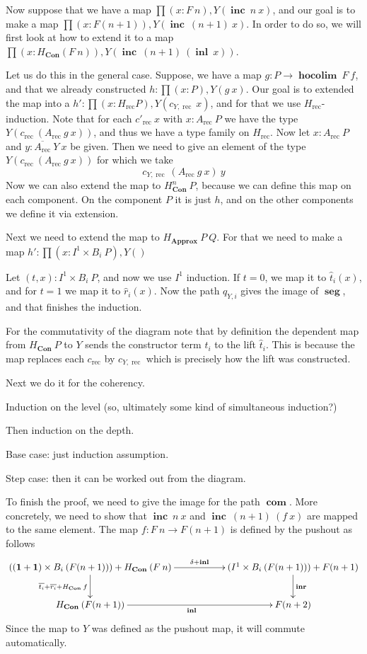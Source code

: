 \documentclass[a4paper,UKenglish]{lipics-v2016}
\newcommand{\one}[0]{\textbf{1}}
\newcommand{\rec}[0]{\operatorname{rec}}
\newcommand{\Con}[0]{\textbf{Con}}
\newcommand{\Approx}[0]{\textbf{Approx}}
\newcommand{\hocolim}[0]{\operatorname{\textbf{hocolim}}}
\newcommand{\seg}[0]{\operatorname{\textbf{seg}}}
\newcommand{\inl}[0]{\operatorname{\textbf{inl}}}
\newcommand{\inr}[0]{\operatorname{\textbf{inr}}}
\newcommand{\inc}[0]{\operatorname{\textbf{inc}}}
\newcommand{\com}[0]{\operatorname{\textbf{com}}}
\newcommand{\dak}[1]{\widehat{#1}}
\newcommand{\hatt}{\dak{t}}
\newcommand{\hatr}{\dak{r}}
\begin{document}
Now suppose that we have a map $\prod (x : F \> n), Y(\inc \> n \> x)$, and our goal is to make a map $\prod  (x : F(n+1)), Y(\inc \> (n+1) \> x)$.
In order to do so, we will first look at how to extend it to a map $\prod (x : H_{\Con} (F \> n)), Y(\inc \> (n+1) \> (\inl \> x))$.

Let us do this in the general case.
Suppose, we have a map $g : P \rightarrow \hocolim \> F \> f$, and that we already constructed $h : \prod (x : P), Y(g \> x)$.
Our goal is to extended the map into a $h' : \prod (x : H_{\rec} P), Y(c_{Y, \rec} \> x)$, and for that we use $H_{\rec}$-induction.
Note that for each $c'_{\rec} \> x$ with $x : A_{\rec} \> P$ we have the type $Y(c_{\rec} \> (A_{\rec} \> g \> x))$, and thus we have a type family on $H_{\rec}$.
Now let $x : A_{\rec} \> P$ and $y : \overline{A_{\rec}} \> Y \> x$ be given.
Then we need to give an element of the type $Y(c_{\rec} \> (A_{\rec} \> g \> x))$ for which we take
\[
c_{Y,\rec} \> (A_{\rec} \> g \> x) \> y
\]
Now we can also extend the map to $H_{\Con}^n \> P$, because we can define this map on each component.
On the component $P$ it is just $h$, and on the other components we define it via extension.

Next we need to extend the map to $H_{\Approx} \> P \> Q$.
For that we need to make a map $h' : \prod (x : I^1 \times B_i \> P), Y()$

Let $(t, x) : I^1 \times B_i \> P$, and now we use $I^1$ induction.
If $t = 0$, we map it to $\hatt_i (x)$, and for $t = 1$ we map it to $\hatr_i (x)$.
Now the path $q_{Y, i}$ gives the image of $\seg$, and that finishes the induction.

For the commutativity of the diagram note that by definition the dependent map from $H_{\Con} \> P$ to $Y$ sends the constructor term $t_i$ to the lift $\hatt_i$.
This is because the map replaces each $c_{\rec}$ by $c_{Y, \rec}$ which is precisely how the lift was constructed.


Next we do it for the coherency.

Induction on the level (so, ultimately some kind of simultaneous induction?)

Then induction on the depth.

Base case: just induction assumption.

Step case: then it can be worked out from the diagram.



To finish the proof, we need to give the image for the path $\com$.
More concretely, we need to show that $\inc \> n \> x$ and $\inc \> (n+1) \> (f \> x)$ are mapped to the same element.
The map $f : F \> n \rightarrow F(n + 1)$ is defined by the pushout as follows
\[
\xymatrix
{
	((\one + \one) \times B_i \> (F(n+1))) + H_{\Con} \>  (F \> n) \ar[d]_{\overline{t_i} + \overline{r_i} + H_{\Con} \> f} \ar[rr]^-{\delta + \inl} & & (I^1 \times B_i \> (F(n+1))) + F(n+1)  \ar[d]^{\inr}\\
	H_{\Con} \> (F(n+1)) \ar[rr]_{\inl} & & F(n+2)
}
\]
Since the map to $Y$ was defined as the pushout map, it will commute automatically.
\end{document}

